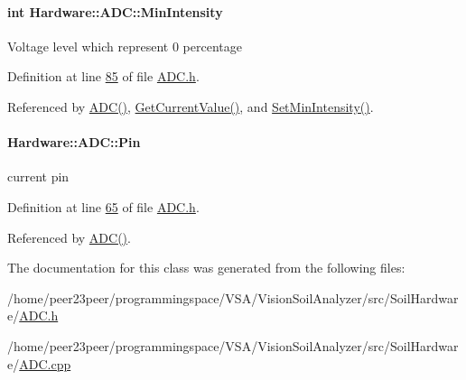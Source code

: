 \hypertarget{class_hardware_1_1_a_d_c_af73224014dddfdd80f77b80e6ed82c13}{}
\paragraph[{Min\+Intensity}]{\setlength{\rightskip}{0pt plus 5cm}int Hardware\+::\+A\+D\+C\+::\+Min\+Intensity\hspace{0.3cm}{\ttfamily [private]}}\label{class_hardware_1_1_a_d_c_af73224014dddfdd80f77b80e6ed82c13}
Voltage level which represent 0 percentage 

Definition at line \hyperlink{_a_d_c_8h_source_l00085}{85} of file \hyperlink{_a_d_c_8h_source}{A\+D\+C.\+h}.



Referenced by \hyperlink{_a_d_c_8cpp_source_l00014}{A\+D\+C()}, \hyperlink{_a_d_c_8cpp_source_l00053}{Get\+Current\+Value()}, and \hyperlink{_a_d_c_8cpp_source_l00061}{Set\+Min\+Intensity()}.

\hypertarget{class_hardware_1_1_a_d_c_acb6d23369c7047296af402ca480bb2f5}{}
\paragraph[{Pin}]{ Hardware\+::\+A\+D\+C\+::\+Pin}\label{class_hardware_1_1_a_d_c_acb6d23369c7047296af402ca480bb2f5}
current pin 

Definition at line \hyperlink{_a_d_c_8h_source_l00065}{65} of file \hyperlink{_a_d_c_8h_source}{A\+D\+C.\+h}.



Referenced by \hyperlink{_a_d_c_8cpp_source_l00014}{A\+D\+C()}.



The documentation for this class was generated from the following files\+:\begin{DoxyCompactItemize}
\item 
/home/peer23peer/programmingspace/\+V\+S\+A/\+Vision\+Soil\+Analyzer/src/\+Soil\+Hardware/\hyperlink{_a_d_c_8h}{A\+D\+C.\+h}\item 
/home/peer23peer/programmingspace/\+V\+S\+A/\+Vision\+Soil\+Analyzer/src/\+Soil\+Hardware/\hyperlink{_a_d_c_8cpp}{A\+D\+C.\+cpp}\end{DoxyCompactItemize}
